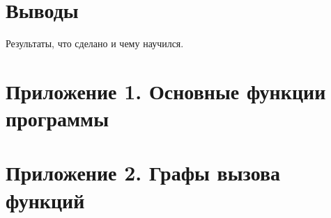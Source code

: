 \documentclass[a4paper,12pt]{report}
\begin{document}



\chapter*{Выводы}

Результаты, что сделано и чему научился.


\cleardoublepage
{}
{}
\chapter*{Приложение 1. Основные функции программы}


% 

% 
% 
% 
% 
% 
% 
% 
% 
% 
% 


\cleardoublepage
{}
{}
\chapter*{Приложение 2. Графы вызова функций}
\end{document}
